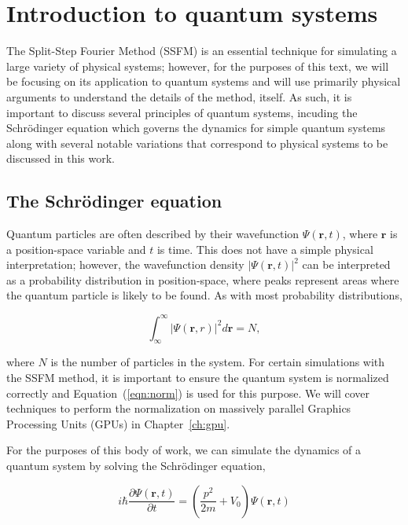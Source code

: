 \chapter*{Introduction to quantum systems}
\label{ch:intro}

The Split-Step Fourier Method (SSFM) is an essential technique for simulating a large variety of physical systems; however, for the purposes of this text, we will be focusing on its application to quantum systems and will use primarily physical arguments to understand the details of the method, itself.
As such, it is important to discuss several principles of quantum systems, incuding the Schr\"odinger equation which governs the dynamics for simple quantum systems along with several notable variations that correspond to physical systems to be discussed in this work.

\section{The Schr\"odinger equation}
Quantum particles are often described by their wavefunction $\Psi(\mathbf{r},t)$, where $\mathbf{r}$ is a position-space variable and $t$ is time.
This does not have a simple physical interpretation; however, the wavefunction density $|\Psi(\mathbf{r},t)|^2$ can be interpreted as a probability distribution in position-space, where peaks represent areas where the quantum particle is likely to be found.
As with most probability distributions,

\begin{equation}
    \label{eqn:norm}
    \int_\infty^\infty |\Psi(\mathbf{r},r)|^2 d\mathbf{r} = N,
\end{equation}

\noindent where $N$ is the number of particles in the system.
For certain simulations with the SSFM method, it is important to ensure the quantum system is normalized correctly and Equation~(\ref{eqn:norm}) is used for this purpose.
We will cover techniques to perform the normalization on massively parallel Graphics Processing Units (GPUs) in Chapter~\ref{ch:gpu}.

For the purposes of this body of work, we can simulate the dynamics of a quantum system by solving the Schr\"odinger equation,

\begin{equation}
    i\hbar\frac{\partial\Psi(\mathbf{r},t)}{\partial t} = \left(\frac{p^2}{2m} + V_0\right) \Psi(\mathbf{r},t)
    \label{eqn:schrody}
\end{equation}

